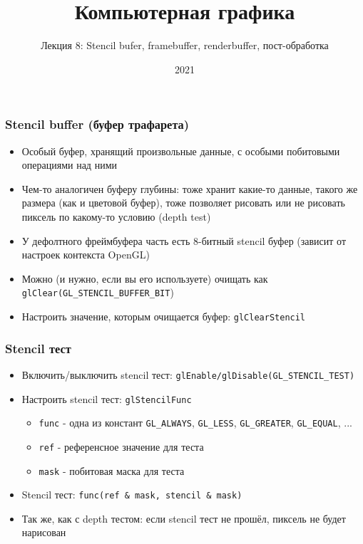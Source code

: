 \documentclass{beamer}
\title{Компьютерная графика}
\subtitle{Лекция 8: Stencil bufer, framebuffer, renderbuffer, пост-обработка}
\date{2021}
\begin{document}
\frame{\titlepage}

\begin{frame}[fragile]
\frametitle{Stencil buffer (буфер трафарета)}
\begin{itemize}
\item Особый буфер, хранящий произвольные данные, с особыми побитовыми операциями над ними
\pause
\item Чем-то аналогичен буферу глубины: тоже хранит какие-то данные, такого же размера (как и цветовой буфер), тоже позволяет рисовать или не рисовать пиксель по какому-то условию (depth test)
\pause
\item У дефолтного фреймбуфера часть есть 8-битный stencil буфер (зависит от настроек контекста OpenGL)
\pause
\item Можно (и нужно, если вы его используете) очищать как \verb|glClear(GL_STENCIL_BUFFER_BIT|)
\pause
\item Настроить значение, которым очищается буфер: \verb|glClearStencil|
\end{itemize}
\end{frame}

\begin{frame}[fragile]
\frametitle{Stencil тест}
\begin{itemize}
\item Включить/выключить stencil тест: \verb|glEnable/glDisable(GL_STENCIL_TEST)|
\pause
\item Настроить stencil тест: \verb|glStencilFunc|
\begin{itemize}
\item \verb|func| - одна из констант \verb|GL_ALWAYS|, \verb|GL_LESS|, \verb|GL_GREATER|, \verb|GL_EQUAL|, ...
\item \verb|ref| - референсное значение для теста
\item \verb|mask| - побитовая маска для теста
\end{itemize}
\item Stencil тест: \verb|func(ref & mask, stencil & mask)|
\pause
\item Так же, как с depth тестом: если stencil тест не прошёл, пиксель не будет нарисован
\end{itemize}
\end{frame}
\end{document}
